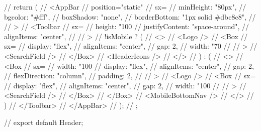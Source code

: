 {//   return (
//     <AppBar
//       position="static"
//       sx={{
//         minHeight: "80px",
//         bgcolor: "#fff",
//         boxShadow: "none",
//         borderBottom: "1px solid #dbc8c8",
//       }}
//     >
//       <Toolbar
//         sx={{
//           height: "100%
//           justifyContent: "space-around",
//           alignItems: "center",
//         }}
//       >
//         {!isMobile ? (
//           <>
//             <Logo />
//             <Box
//               sx={{
//                 display: "flex",
//                 alignItems: "center",
//                 gap: 2,
//                 width: "70%
//               }}
//             >
//               <SearchField />
//             </Box>
//             <HeaderIcons />
//           </>
//         ) : (
//           <>
//             <Box
//               sx={{
//                 width: "100%
//                 display: "flex",
//                 alignItems: "center",
//                 gap: 2,
//                 flexDirection: "column",
//                 padding: 2,
//               }}
//             >
//               <Logo />
//               <Box
//                 sx={{
//                   display: "flex",
//                   alignItems: "center",
//                   gap: 2,
//                   width: "100%
//                 }}
//               >
//                 <SearchField />
//               </Box>
//             </Box>
//             <MobileBottomNav />
//           </>
//         )}
//       </Toolbar>
//     </AppBar>
//   );
// };

// export default Header;